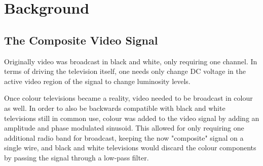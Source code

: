 \section{Background}

\subsection{The Composite Video Signal}

Originally video was broadcast in black and white, only requiring one channel.
In terms of driving the television itself, one needs only change DC voltage in
the active video region of the signal to change luminosity levels.

Once colour televisions became a reality, video needed to be broadcast in colour
as well. In order to also be backwards compatible with black and white
televisions still in common use, colour was added to the video signal by adding
an amplitude and phase modulated sinusoid. This allowed for only requiring one
additional radio band for broadcast, keeping the now "composite" signal on a
single wire, and black and white televisions would discard the colour components
by passing the signal through a low-pass filter.

\subsubsection{}

\subsection{}

